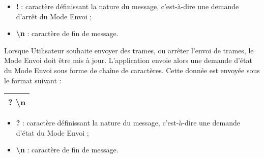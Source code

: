 \medspace

\begin{itemize}
    \item \textbf{!} : caractère définissant la nature du message, c'est-à-dire une demande d'arrêt du Mode Envoi ;
    \item \textbf{\textbackslash n} : caractère de fin de message.\\
\end{itemize}


Lorsque Utilisateur souhaite envoyer des trames, ou arrêter l'envoi de trames, le Mode Envoi doit être mis à jour. L'application {\nomApplication} envoie alors une demande d'état du Mode Envoi sous forme de chaîne de caractères. Cette donnée est envoyée sous le format suivant :\\

\begin{minipage}
    \textwidth
    \centering
    \begin{tabular}{|c|}
        \hline
        ? \textbackslash n\\
        \hline
    \end{tabular}
\end{minipage}

\medspace

\begin{itemize}
    \item \textbf{?} : caractère définissant la nature du message, c'est-à-dire une demande d'état du Mode Envoi ;
    \item \textbf{\textbackslash n} : caractère de fin de message.\\
\end{itemize}